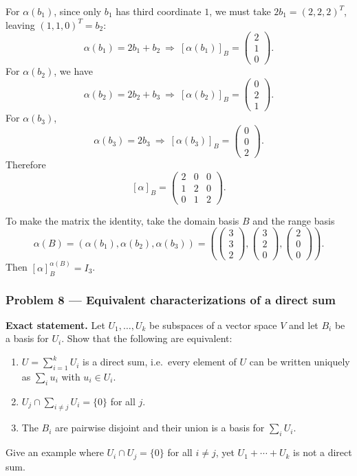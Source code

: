 \documentclass[12pt,a4paper]{article}
\theoremstyle{plain}
\theoremstyle{definition}      %
\begin{document}
For $\alpha(b_1)$, since only $b_1$ has third coordinate $1$, we must take $2b_1=(2,2,2)^T$, leaving $(1,1,0)^T=b_2$:
\[
\alpha(b_1)=2b_1+b_2 \ \Rightarrow\ [\alpha(b_1)]_B=\begin{pmatrix}2\\1\\0\end{pmatrix}.
\]
For $\alpha(b_2)$, we have
\[
\alpha(b_2)=2b_2+b_3 \ \Rightarrow\ [\alpha(b_2)]_B=\begin{pmatrix}0\\2\\1\end{pmatrix}.
\]
For $\alpha(b_3)$,
\[
\alpha(b_3)=2b_3 \ \Rightarrow\ [\alpha(b_3)]_B=\begin{pmatrix}0\\0\\2\end{pmatrix}.
\]
Therefore
\[
[\alpha]_B=
\begin{pmatrix}
	2&0&0\\
	1&2&0\\
	0&1&2
\end{pmatrix}.
\]

To make the matrix the identity, take the domain basis $B$ and the range basis
\[
\alpha(B)=(\alpha(b_1),\alpha(b_2),\alpha(b_3))
=\left(
\begin{pmatrix}3\\3\\2\end{pmatrix},
\begin{pmatrix}3\\2\\0\end{pmatrix},
\begin{pmatrix}2\\0\\0\end{pmatrix}
\right).
\]
Then $[\alpha]_{B}^{\alpha(B)}=I_3$.

\bigskip

\subsubsection*{Problem 8 — Equivalent characterizations of a direct sum}

\textbf{Exact statement.}
Let $U_1,\dots,U_k$ be subspaces of a vector space $V$ and let $B_i$ be a basis for $U_i$.
Show that the following are equivalent:
\begin{enumerate}
	\item[(i)] $U=\sum_{i=1}^k U_i$ is a direct sum, i.e.\ every element of $U$ can be written uniquely as $\sum_i u_i$ with $u_i\in U_i$.
	\item[(ii)] $U_j\cap \sum_{i\ne j}U_i=\{0\}$ for all $j$.
	\item[(iii)] The $B_i$ are pairwise disjoint and their union is a basis for $\sum_i U_i$.
\end{enumerate}
Give an example where $U_i\cap U_j=\{0\}$ for all $i\ne j$, yet $U_1+\cdots+U_k$ is not a direct sum.
\end{document}
